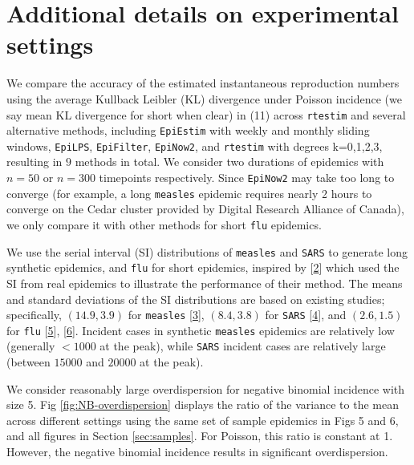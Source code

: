 \documentclass[
]{article}
\begin{document}
\hypertarget{additional-details-on-experimental-settings}{%
\section{Additional details on experimental settings}\label{additional-details-on-experimental-settings}}

We compare the accuracy of the estimated instantaneous reproduction numbers using
the average Kullback Leibler (KL) divergence under Poisson
incidence (we say mean KL divergence for short when clear) in (11) across
\texttt{rtestim} and several alternative
methods, including \texttt{EpiEstim} with weekly and monthly sliding windows, \texttt{EpiLPS},
\texttt{EpiFilter}, \texttt{EpiNow2}, and \texttt{rtestim} with degrees k=0,1,2,3, resulting in \(9\)
methods in total. We consider two durations of epidemics with \(n=50\) or \(n=300\)
timepoints respectively. Since \texttt{EpiNow2} may take too long to converge (for example,
a long \texttt{measles} epidemic requires nearly 2 hours to converge on the
Cedar cluster provided by Digital Research Alliance of Canada), we only compare it with
other methods for short \texttt{flu} epidemics.

We use the serial interval (SI) distributions of \texttt{measles} and \texttt{SARS} to generate
long synthetic epidemics, and \texttt{flu} for short epidemics, inspired by {[}\protect\hyperlink{ref-cori2013new}{2}{]}
which used the SI from real epidemics to illustrate the performance of their method.
The means and standard deviations of the SI distributions are based on existing
studies; specifically, \((14.9, 3.9)\) for \texttt{measles} {[}\protect\hyperlink{ref-groendyke2011bayesian}{3}{]},
\((8.4,3.8)\) for \texttt{SARS} {[}\protect\hyperlink{ref-lipsitch2003transmission}{4}{]}, and \((2.6,1.5)\) for
\texttt{flu} {[}\protect\hyperlink{ref-ferguson2005strategies}{5}{]}, {[}\protect\hyperlink{ref-boelle2011transmission}{6}{]}.
Incident cases in synthetic \texttt{measles} epidemics are relatively low (generally \(<1000\) at
the peak), while \texttt{SARS} incident cases are relatively large (between \(15000\)
and \(20000\) at the peak).

We consider reasonably large
overdispersion for negative binomial incidence with size 5. Fig
\ref{fig:NB-overdispersion} displays the ratio of the variance to the
mean across different settings
using the same set of sample epidemics in Figs 5 and 6, and all figures in
Section \ref{sec:samples}. For Poisson, this ratio is constant at 1. However,
the negative binomial incidence results in significant overdispersion.
\end{document}
